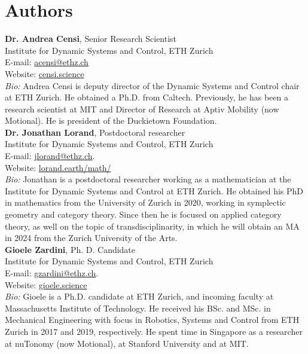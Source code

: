 \documentclass[10pt, article, one side]{memoir}
\begin{document}
    \section{Authors}
    \noindent \textbf{Dr.
        Andrea Censi}, Senior Research Scientist\\
    Institute for Dynamic Systems and Control, ETH Zurich\\
    E-mail: \href{mailto:acensi@ethz.ch}{acensi@ethz.ch}\\
    Website: \href{https://censi.science}{censi.science}\\
    \emph{Bio:} Andrea Censi is deputy director of the Dynamic Systems and Control chair at ETH Zurich.
    He obtained a Ph.D.
    from Caltech.
    Previously, he has been a research scientist at MIT and Director of Research at Aptiv Mobility (now Motional).
    He is president of the Duckietown Foundation.
    \\

    \noindent \textbf{Dr.
        Jonathan Lorand}, Postdoctoral researcher\\
    Institute for Dynamic Systems and Control, ETH Zurich\\
    E-mail: \href{mailto:jlorand@ethz.ch}{jlorand@ethz.ch}.
    \\
    Website: \href{http://lorand.earth/math/}{lorand.earth/math/}\\
    \emph{Bio:}
    Jonathan is a postdoctoral researcher working as a mathematician at the Institute for Dynamic Systems and Control at ETH Zurich.
    He obtained his PhD in mathematics from the University of Zurich in 2020, working in symplectic geometry and category theory.
    Since then he is focused on applied category theory, as well on the topic of transdisciplinarity, in which he will obtain an MA in 2024 from the Zurich University of the Arts.
    \\

    \noindent \textbf{Gioele Zardini}, Ph.
    D.
    Candidate\\
    Institute for Dynamic Systems and Control, ETH Zurich\\
    E-mail: \href{mailto:gzardini@ethz.ch}{gzardini@ethz.ch}.
    \\
    Website: \href{https://gioele.science}{gioele.science}\\
    \emph{Bio:}
    Gioele is a Ph.D.
    candidate at ETH Zurich, and incoming faculty at Massachusetts Institute of Technology.
    He received his BSc.
    and MSc. in Mechanical Engineering with focus in Robotics, Systems and Control from ETH Zurich in 2017 and 2019, respectively.
    He spent time in Singapore as a researcher at nuTonomy (now Motional), at Stanford University and at MIT.
    \\
\end{document}
